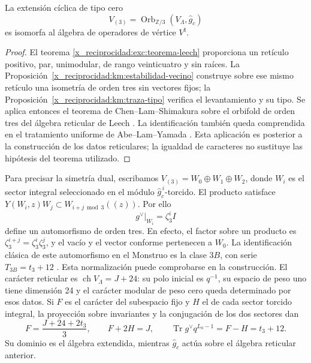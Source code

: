 \begin{theorem}
\label{x_reciprocidad:km:moonshine-tres}
La extensión cíclica de tipo cero
\begin{equation}
 V_{(3)}=\operatorname{Orb}_{\mathbb Z/3}
                 (V_\Lambda,\widehat g_c)
 \label{x_reciprocidad:km:extension-orden3}
\end{equation}
es isomorfa al álgebra de operadores de vértice \(V^\natural\).
\end{theorem}
\begin{proof}
El teorema \ref{x_reciprocidad:exc:teorema-leech} proporciona un retículo positivo,
par, unimodular, de rango veinticuatro y sin raíces. La
Proposición~\ref{x_reciprocidad:km:estabilidad-vecino} construye sobre ese mismo
retículo una isometría de orden tres sin vectores fijos; la
Proposición~\ref{x_reciprocidad:km:traza-tipo} verifica el levantamiento y su tipo.
Se aplica entonces el teorema de Chen--Lam--Shimakura sobre el
orbifold de orden tres del álgebra reticular de Leech
\cite[Teorema~1.1]{x_reciprocidad:chenlamshimakura2016}. La identificación también queda comprendida
en el tratamiento uniforme de Abe--Lam--Yamada
\cite[Teorema~4.4 y secciones~2--4]{x_reciprocidad:abelamyamada2017}. Esta aplicación es posterior a la construcción
de los datos reticulares; la igualdad de caracteres no sustituye las
hipótesis del teorema utilizado.
\end{proof}

Para precisar la simetría dual, escribamos
\(V_{(3)}=W_0\oplus W_1\oplus W_2\), donde \(W_i\) es el sector
integral seleccionado en el módulo \(\widehat g_c^{\,i}\)-torcido.
El producto satisface
\(Y(W_i,z)W_j\subset W_{i+j\bmod3}((z))\). Por ello
\begin{equation}
 g^\vee|_{W_i}=\zeta_3^i I
 \label{x_reciprocidad:km:dual-ciclico}
\end{equation}
define un automorfismo de orden tres. En efecto, el factor sobre un
producto es \(\zeta_3^{i+j}=\zeta_3^i\zeta_3^j\), y el vacío y el
vector conforme pertenecen a \(W_0\). La identificación clásica de
este automorfismo en el Monstruo es la clase \(3B\), con serie
\(T_{3B}=t_3+12\) \cite{x_reciprocidad:kmconwaynorton1979,x_reciprocidad:borcherds}.
Esta normalización puede comprobarse en la construcción. El carácter
reticular es \(\operatorname{ch}V_\Lambda=J+24\): su polo inicial
es \(q^{-1}\), su espacio de peso uno tiene dimensión 24 y el
carácter modular de peso cero queda determinado por esos datos.
Si \(F\) es el carácter del subespacio fijo y \(H\) el de cada
sector torcido integral, la proyección sobre invariantes y la conjugación
de los dos sectores dan
\[
 F=\frac{J+24+2t_3}{3},\qquad F+2H=J,
 \qquad \operatorname{Tr}g^\vee q^{L_0-1}=F-H=t_3+12.
\]
Su dominio es el álgebra extendida, mientras
\(\widehat g_c\) actúa sobre el álgebra reticular anterior.

